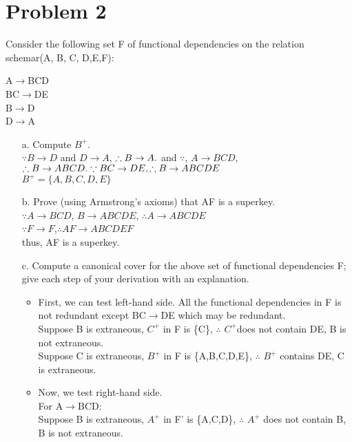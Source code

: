 \documentclass[paper=a4, fontsize=11pt]{scrartcl} %
\numberwithin{equation}{section} %
\numberwithin{figure}{section} %
\numberwithin{table}{section} %
\begin{document}
\section{Problem 2}
Consider the following set F of functional dependencies on the relation schemar(A, B, C, D,E,F):
\begin{center}
A$\rightarrow$BCD \\
BC$\rightarrow$DE \\
B$\rightarrow$D \\
D$\rightarrow$A
\end{center}
\begin{itemize}
\item[a.] Compute $B^{+}$.\\
$\because B \rightarrow D$ and $ D \rightarrow A$, $\therefore B \rightarrow A. \\
$ and $ \because$, $A \rightarrow BCD$, $\therefore B \rightarrow ABCD.\\
\because BC \rightarrow DE, \therefore B\rightarrow ABCDE$\\
$B^{+}= \{A,B,C,D,E\}$
\item[b.] Prove (using Armstrong's axioms) that AF is a superkey.\\
$\because A \rightarrow BCD$, $B \rightarrow ABCDE$, $\therefore A\rightarrow ABCDE$\\
$\because F\rightarrow F$,$\therefore AF\rightarrow ABCDEF$\\
thus, AF is a superkey.
\item[c.] Compute a canonical cover for the above set of functional dependencies F; give each step of your derivation with an explanation.\\
    \begin{itemize}
    \item First, we can test left-hand side. All the functional dependencies in F is not redundant except BC$\rightarrow$DE which may be redundant. \\
        Suppose B is extraneous, $C^{+}$ in F is \{C\}, $\therefore$ $C^{+}$does not contain DE, B is not extraneous.\\
        Suppose C is extraneous, $B^{+}$ in F is \{A,B,C,D,E\}, $\therefore$ $B^{+}$ contains DE, C is extraneous.
    \item Now, we test right-hand side. \\
        For A$\rightarrow$BCD:\\
        Suppose B is extraneous, $A^{+}$ in F' is \{A,C,D\}, $\therefore$ $A^{+}$ does not contain B, B is not extraneous.\\

\end{itemize}
\end{itemize}
\end{document}
